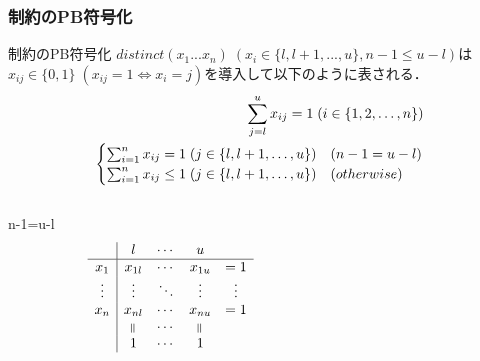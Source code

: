 \newcommand{\rgeq}{\rotatebox[origin=c]{90}{$\geq$}}
\newcommand{\req}{\rotatebox[origin=c]{90}{$=$}}
\begin{frame}\small
    \frametitle{\distinct 制約のPB符号化}
    \begin{block}{ \distinct 制約のPB符号化}
        $distinct(x_1 ... x_n) \; (x_i \in \{l, l+1, ..., u\}, n-1 \leq u-l)$は
        $x_{ij} \in \{0,1\} \; (x_{ij}=1 \Leftrightarrow x_i=j)$を導入して以下のように表される．
        \vspace{-3mm}
        \begin{eqnarray*}
            \sum_{j=l}^{u} x_{ij}=1 \; (i \in \{1,2,\ldots,n\}) \label{eq:pb_1}\\
            \vspace{-3mm}
            \begin{cases}
                \sum_{i=1}^{n} x_{ij} = 1 \; (j \in \{l,l+1,\ldots,u\}) & (n-1=u-l) \\
                \sum_{i=1}^{n} x_{ij} \leq 1 \; (j \in \{l,l+1,\ldots,u\}) & (otherwise)
            \end{cases}\label{eq:pb_2}
        \end{eqnarray*}
    \end{block}
    \vspace{-3mm}
    \begin{columns}
        \begin{column}{0.5\textwidth}
    \begin{exampleblock}{n-1=u-l}
        \begin{displaymath}
        \begin{array}{c|cccc}
                & l      & \cdots & u      &       \\\hline
         x_1    & x_{1l} & \cdots & x_{1u} & =1    \\
         \vdots & \vdots & \ddots & \vdots & \vdots\\
         x_n    & x_{nl} & \cdots & x_{nu} & =1    \\
                & \req   & \cdots & \req   &       \\
                & 1      & \cdots & 1      &
        \end{array}
        \end{displaymath}
    \end{exampleblock}
        \end{column}
        \begin{column}{0.5\textwidth}

\end{column}
\end{columns}
\end{frame}
